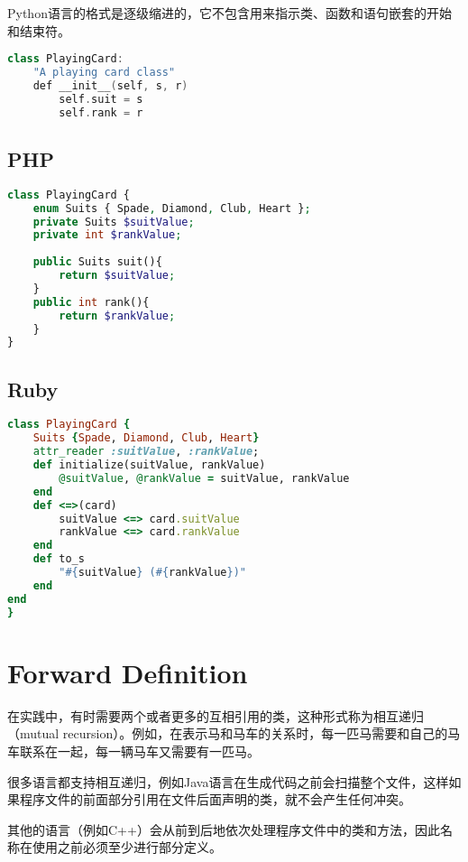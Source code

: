 Python语言的格式是逐级缩进的，它不包含用来指示类、函数和语句嵌套的开始和结束符。


\begin{lstlisting}[language=C++]
class PlayingCard:
	"A playing card class"
	def __init__(self, s, r)
		self.suit = s
		self.rank = r
\end{lstlisting}


\subsection{PHP}




\begin{lstlisting}[language=PHP]
class PlayingCard {
	enum Suits { Spade, Diamond, Club, Heart };
	private Suits $suitValue;
	private int $rankValue;
	
	public Suits suit(){
		return $suitValue;
	}
	public int rank(){
		return $rankValue;
	}
}
\end{lstlisting}



\subsection{Ruby}



\begin{lstlisting}[language=Ruby]
class PlayingCard {
	Suits {Spade, Diamond, Club, Heart}
	attr_reader :suitValue, :rankValue;
	def initialize(suitValue, rankValue)
		@suitValue, @rankValue = suitValue, rankValue
	end
	def <=>(card)
		suitValue <=> card.suitValue
		rankValue <=> card.rankValue
	end
	def to_s
		"#{suitValue} (#{rankValue})"
	end
end
}
\end{lstlisting}





\section{Forward Definition}

在实践中，有时需要两个或者更多的互相引用的类，这种形式称为相互递归（mutual recursion）。例如，在表示马和马车的关系时，每一匹马需要和自己的马车联系在一起，每一辆马车又需要有一匹马。

很多语言都支持相互递归，例如Java语言在生成代码之前会扫描整个文件，这样如果程序文件的前面部分引用在文件后面声明的类，就不会产生任何冲突。

其他的语言（例如C++）会从前到后地依次处理程序文件中的类和方法，因此名称在使用之前必须至少进行部分定义。


